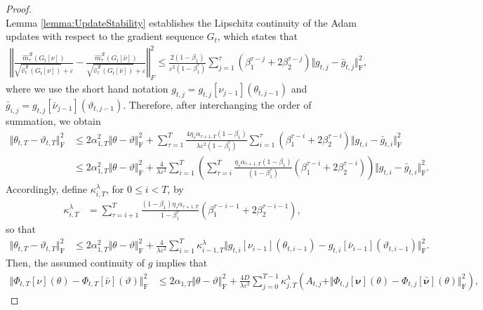\documentclass{article}
\begin{document}
\begin{appendices}
\begin{proof}
\[\]
Lemma \ref{lemma:UpdateStability} establishes the Lipschitz continuity of the Adam updates with respect to the gradient sequence $G_t$, which states that
\begin{align*}
    \left\Vert\frac{\hat m^{\mathcal R}_\tau(G_t[\nu])}{\sqrt{\hat v^{\mathcal R}_\tau(G_t[\nu])}+\varepsilon}-\frac{\hat m^{\mathcal R}_\tau(G_t[\bar\nu])}{\sqrt{\hat v^{\mathcal R}_\tau(G_t[\bar\nu])}+\varepsilon}\right\Vert_F^2 
\le \frac{2(1-\beta_1)}{\varepsilon^2(1-\beta_1^\tau)}\sum_{j=1}^\tau(\beta_1^{\tau-j}+2\beta_2^{\tau-j})\Vert g_{t,j}-\bar g_{t,j}\Vert_\mathrm{F}^2,
\end{align*}
where we use the short hand notation $g_{t,j}=g_{t,j}[\nu_{j-1}](\theta_{t,j-1})$ and $\bar g_{i,j}=g_{t,j}[\bar\nu_{j-1}](\vartheta_{t,j-1})$. Therefore, after interchanging the order of summation, we obtain
\begin{align*}
     \Vert\theta_{t,T}-\vartheta_{t,T}\Vert^2_\mathrm{F}  &\le 2\alpha^2_{1,T}\Vert \theta-\vartheta\Vert^2_\mathrm{F}+\sum_{\tau=1}^T \frac{4\eta_\tau\alpha_{\tau+1,T} (1-\beta_1)}{\lambda \varepsilon^2 (1-\beta_1^\tau)}\sum_{i=1}^\tau (\beta_1^{\tau-i}+2\beta_2^{\tau-i})\Vert g_{t,i}-\bar g_{t,i}\Vert^2_\mathrm{F}\\
     & \le 2\alpha^2_{1,T}\Vert \theta-\vartheta\Vert^2_\mathrm{F}+\frac{4}{\lambda \varepsilon^2}\sum_{i=1}^T\left(\sum_{\tau=i}^T  \frac{\eta_\tau\alpha_{\tau+1,T} (1-\beta_1)}{ (1-\beta_1^\tau)}(\beta_1^{\tau-i}+2\beta_2^{\tau-i})\right) \Vert g_{t,i}-\bar g_{t,i}\Vert^2_\mathrm{F}.
\end{align*}
Accordingly, define $\kappa^\lambda_{i,T}$, for $0\le i < T$, by
\begin{align}\label{eqn:kappa_}
    \kappa^\lambda_{i,T} &=\sum_{\tau=i+1}^T\frac{(1-\beta_1)\eta_\tau\alpha_{\tau+1,T}}{1-\beta_1^\tau}(\beta_1^{\tau-i-1}+2\beta_2^{\tau-i-1}),
\end{align}
so that 
\begin{align}\label{eqn:DeltaTheta}
     \Vert\theta_{t,T}-\vartheta_{t,T}\Vert^2_\mathrm{F}  &\le 2\alpha^2_{1,T}\Vert \theta-\vartheta\Vert^2_\mathrm{F}+\frac{4}{\lambda\varepsilon^2} \sum_{i=1}^{T} \kappa^\lambda_{i-1,T} \Vert g_{t,i}[\nu_{i-1}](\theta_{t,i-1})- g_{t,i}[\bar \nu_{i-1}](\vartheta_{t,i-1})\Vert^2_\mathrm{F}.
\end{align}
Then, the assumed continuity of $g$ implies that
\begin{align*}
     \Vert\Phi_{t,T}[\nu](\theta)-\Phi_{t,T}[\bar\nu](\vartheta)\Vert^2_\mathrm{F} &\le 2\alpha_{1,T}\Vert \theta-\vartheta\Vert^2_\mathrm{F}+ \frac{4D}{\lambda\varepsilon^2}\sum_{j=0}^{T-1}\kappa^\lambda_{j,T}\left( A_{t,j} + \Vert\Phi_{t,j}[\bm\nu](\theta)-\Phi_{t,j}[\bm{\bar\nu}](\theta)\Vert^2_\mathrm{F}\right),

\end{align*}
\end{proof}
\end{appendices}
\end{document}
